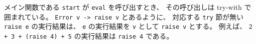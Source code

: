メイン関数である \texttt{start} が \texttt{eval} を呼び出すとき、
その呼び出しは try-with で囲まれている。
\texttt{Error v -> raise v} とあるように、
対応する \texttt{try} 節が無い \texttt{raise e} の実行結果は、
\texttt{e} の実行結果を \texttt{v} として \texttt{raise v} とする。
例えば、 \texttt{2 + 3 + (raise 4) + 5} の実行結果は \texttt{raise 4} である。
